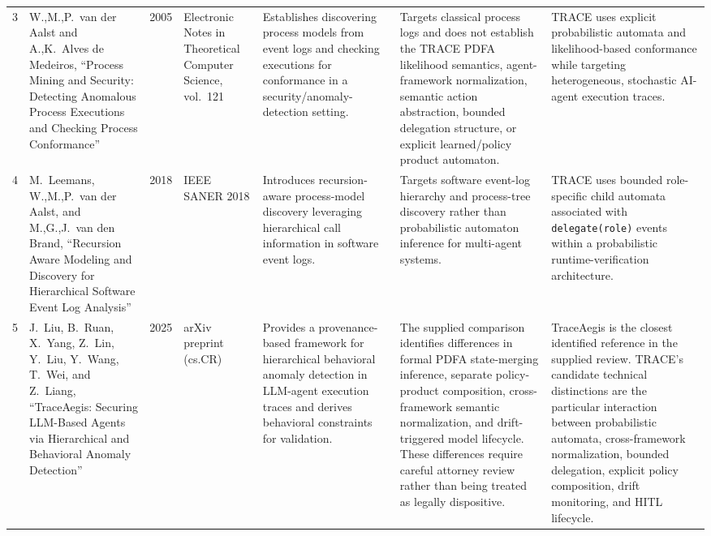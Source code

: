 \documentclass[11pt,a4paper]{article}
\begin{document}
\begin{landscape}
\begin{longtable}{C{0.7cm} L{3.3cm} C{1.3cm} L{2.5cm} L{4.2cm} L{4.2cm} L{4.2cm}}
\addlinespace

3 &
W.,M.,P.\ van der Aalst and A.,K.\ Alves de Medeiros, ``Process Mining and Security:
Detecting Anomalous Process Executions and Checking Process Conformance'' &
2005 &
Electronic Notes in Theoretical Computer Science, vol.\ 121 &
Establishes discovering process models from event logs and checking executions for
conformance in a security/anomaly-detection setting. &
Targets classical process logs and does not establish the TRACE PDFA likelihood semantics,
agent-framework normalization, semantic action abstraction, bounded delegation structure,
or explicit learned/policy product automaton. &
TRACE uses explicit probabilistic automata and likelihood-based conformance while
targeting heterogeneous, stochastic AI-agent execution traces. \\

\addlinespace

4 &
M.\ Leemans, W.,M.,P.\ van der Aalst, and M.,G.,J.\ van den Brand, ``Recursion Aware
Modeling and Discovery for Hierarchical Software Event Log Analysis'' &
2018 &
IEEE SANER 2018 &
Introduces recursion-aware process-model discovery leveraging hierarchical call
information in software event logs. &
Targets software event-log hierarchy and process-tree discovery rather than probabilistic
automaton inference for multi-agent systems. &
TRACE uses bounded role-specific child automata associated with
\texttt{delegate(role)} events within a probabilistic runtime-verification architecture. \\

\addlinespace

5 &
J.\ Liu, B.\ Ruan, X.\ Yang, Z.\ Lin, Y.\ Liu, Y.\ Wang, T.\ Wei, and Z.\ Liang,
``TraceAegis: Securing LLM-Based Agents via Hierarchical and Behavioral Anomaly
Detection'' &
2025 &
arXiv preprint (cs.CR) &
Provides a provenance-based framework for hierarchical behavioral anomaly detection in
LLM-agent execution traces and derives behavioral constraints for validation. &
The supplied comparison identifies differences in formal PDFA state-merging inference,
separate policy-product composition, cross-framework semantic normalization, and
drift-triggered model lifecycle. These differences require careful attorney review rather
than being treated as legally dispositive. &
TraceAegis is the closest identified reference in the supplied review. TRACE's candidate
technical distinctions are the particular interaction between probabilistic automata,
cross-framework normalization, bounded delegation, explicit policy composition, drift
monitoring, and HITL lifecycle. \\

\end{longtable}
\end{landscape}
\end{document}
